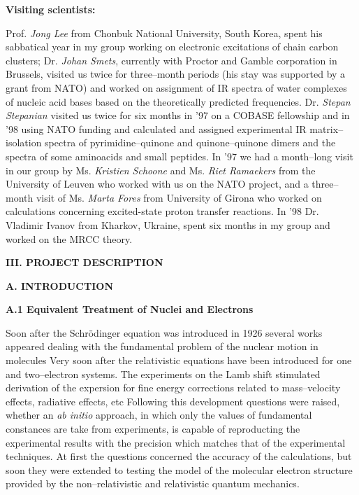 \vspace{2mm}
\noindent
{\bf Visiting scientists:}

\noindent
Prof. {\em Jong Lee} from Chonbuk National University,
South Korea, spent his sabbatical year in my group 
working on electronic excitations of chain carbon clusters; 
Dr. {\em Johan Smets}, currently with Proctor and Gamble
corporation in Brussels,
visited us twice for three--month periods (his stay
was supported by a grant from NATO) and worked 
on assignment of IR spectra of water complexes of nucleic
acid bases based on the theoretically predicted 
frequencies.  
Dr. {\em Stepan Stepanian} visited us twice
for  six months  
in '97 on a COBASE fellowship 
and in '98 using  NATO funding and calculated and
assigned experimental IR matrix--isolation 
spectra of pyrimidine--quinone and quinone--quinone dimers
and the spectra of some aminoacids and small peptides.
In '97 we had a month--long visit in our group by Ms.
{\em Kristien Schoone} and Ms. {\em Riet Ramaekers} 
from the University of Leuven
who worked with us on the NATO project, and a three--month visit
of Ms. {\em Marta Fores} from University of Girona who worked
on calculations concerning excited-state proton transfer
reactions.
In '98 Dr. Vladimir Ivanov from Kharkov, Ukraine, spent six
months in my group and worked on the MRCC theory.

\vspace{4mm}
\noindent
{\bf III.  PROJECT DESCRIPTION}

\vspace{2mm}
\noindent
{\bf A. INTRODUCTION}

\vspace{2mm}
\noindent
{\bf A.1 Equivalent Treatment of Nuclei and Electrons}



Soon after the Schr\"{o}dinger equation was introduced in 1926
several works appeared dealing with the fundamental problem of the
nuclear motion in molecules 
Very soon after the relativistic equations have been introduced
for one and two--electron systems.
The experiments
on the Lamb shift stimulated derivation of the expersion
for fine energy corrections related to mass--velocity effects,
radiative effects, etc\cite{k8}
Following this development questions were raised, whether an
{\it ab initio} approach, in which only the values of
fundamental constances are take from experiments, is capable
of reproducting the experimental results with the precision
which matches that of the experimental techniques. At first
the questions concerned
the accuracy of the calculations, but soon they were extended
to testing the model of the molecular electron structure
provided by the non--relativistic and relativistic quantum mechanics.


